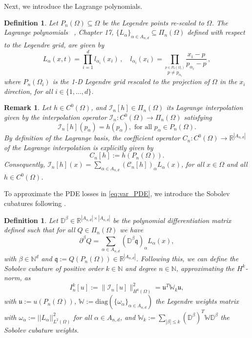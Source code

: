 \documentclass[pdflatex]{sn-jnl}%
\newtheorem{remark}[theorem]{Remark}
\newtheorem{definition}[theorem]{Definition}
\begin{document}
Next, we introduce the Lagrange polynomials.
\begin{definition}\label{def:Lag_p}
Let $P_{n}(\Omega)\subseteq \Omega$ be the Legendre points \cite{GW-Method} re-scaled to $\Omega$. The \emph{Lagrange polynomials} ~\cite{Trefethen2019}, Chapter 17, $\{L_{\alpha}\}_{\alpha\in A_{n,d}}\subseteq \Pi_{n}(\Omega)$ defined with respect to the Legendre grid, are given by
\begin{equation}\label{eq:Lag}
    L_{\alpha}(x,t) = \prod_{i=1}^{d}l_{\alpha_i}(x_i)\,, \quad l_{\alpha_i}(x_i) = \prod_{\stackrel{p\in P_{n}(\Omega_i)}{p \not = p_{\alpha_i}}} \frac{x_i -p}{p_{\alpha_i}-p}\,,
    \end{equation}
    where $P_n(\Omega_i)$ is the 1-D Legendre grid rescaled to the projection of $\Omega$ in the $x_i$ direction, for all $i\in\{1,\dots ,d\}$.
\end{definition}
\begin{remark}\label{rk:interpolation}
Let $h\in C^0(\Omega)$, and $\mathcal{I}_n[h]\in \Pi_n(\Omega)$ its Lagrange interpolation given by the interpolation operator $\mathcal{I}_n:C^0(\Omega)\rightarrow \Pi_n(\Omega)$ satisfying
\begin{equation}
    \mathcal{I}_n[h](p_\alpha) = h(p_\alpha),\textrm{ for all }p_\alpha\in P_n(\Omega).
\end{equation}
  By definition of the Lagrange basis, the coefficient operator $C_n:C^0(\Omega)\rightarrow \mathbb{R}^{|A_{n,d}|}$ of the Lagrange interpolation is explicitly given by \begin{equation}
      C_n[h]:= h(P_n(\Omega)).
  \end{equation}
  Consequently, $\mathcal{I}_n[h](x) = \sum\limits_{\alpha\in A_{n,d}}(\mathcal{C}_n[h])_\alpha L_\alpha (x)$, for all $x\in \Omega$ and all $h\in C^0(\Omega)$.
\end{remark}
To approximate the PDE losses in \eqref{eq:var_PDE}, we introduce the Sobolev cubatures following \cite{Cardona2024-sr,Cardona2023-ma}.
\begin{definition}
    Let $\mathbb{D}^\beta\in \mathbb{R}^{|A_{n,d}|\times |A_{n,d}|}$ be the polynomial differentiation matrix defined such that for all $Q\in \Pi_n(\Omega)$ we have 
    \begin{equation}
        \partial^\beta Q =\sum\limits_{\alpha\in A_{n,d}}(\mathbb{D}^\beta \mathfrak{q})_\alpha L_{\alpha}(x),
    \end{equation}
    with $\beta\in \mathbb{N}^d$ and $\mathfrak{q}:=Q(P_{n}(\Omega))\in  \mathbb{R}^{|A_{n,d}|}$. Following this, we can define the \emph{Sobolev cubature} of positive order $k\in \mathbb{N}$ and degree $n\in \mathbb{N}$, approximating the $H^k$-norm, as
    \begin{equation}
          I_n^k[u]:= \|\mathcal{I}_n[u]\|_{H^k(\Omega)}^2=\mathfrak{u}^T\mathbb{W}_k\mathfrak{u},
    \end{equation}
    with $\mathfrak{u}:=u(P_n(\Omega))$, $\mathbb{W}:=\mathrm{diag}(\{\omega_\alpha\}_{\alpha\in A_{n,d}})$ the Legendre weights matrix with $\omega_\alpha:=||L_\alpha||_{L^2(\Omega)}^2$ for all $\alpha\in A_{n,d}$, and $\mathbb{W}_k:=\sum\limits_{|\beta|\leq k}(\mathbb{D}^{\beta})^T\mathbb{W}\mathbb{D}^{\beta}$ the Sobolev cubature weights. 
    \end{definition}
\end{document}
